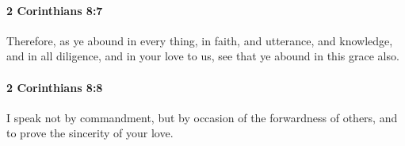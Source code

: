 		\paragraph{2 Corinthians 8:7} %
			\label{2CORINTHIANS-8-7}

			Therefore, as ye abound in every thing, in faith, and utterance, and knowledge, and in all diligence, and in your love to us, see that ye abound in this grace also.

			\begin{framed}
			\scriptsize
				\begin{compactdesc}
					\item[SBLG] 
				\end{compactdesc}
			\end{framed}

		\paragraph{2 Corinthians 8:8} %
			\label{2CORINTHIANS-8-8}

			I speak not by commandment, but by occasion of the forwardness of others, and to prove the sincerity of your love.

